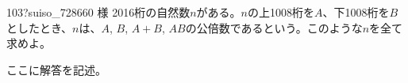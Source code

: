 \begin{thm}{103}{\hosi ?}{suiso\_728660 様}
 2016桁の自然数$n$がある。$n$の上1008桁を$A$、下1008桁を$B$としたとき、$n$は、$A$, $B$, $A+B$, $AB$の公倍数であるという。このような$n$を全て求めよ。
\end{thm}

ここに解答を記述。
